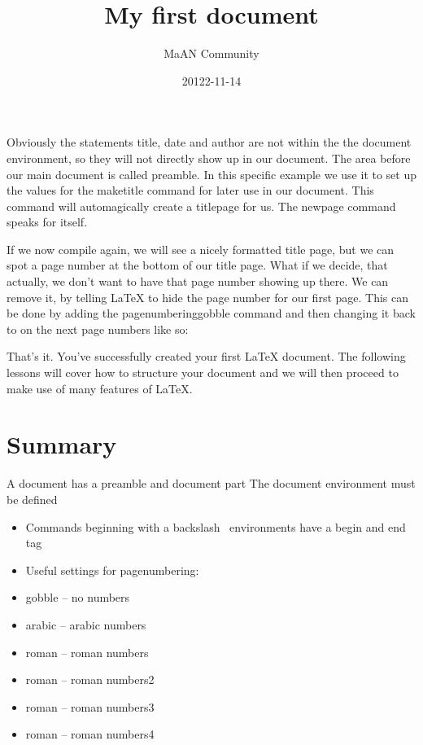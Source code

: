 \documentclass{article}
\title{My first document}
\date{20122-11-14}
\author{MaAN Community}
\begin{document}
	\maketitle
	\newpage
	
Obviously the statements title, date and author are not within the the document environment, so they will not directly show up in our document. The area before our main document is called preamble. In this specific example we use it to set up the values for the maketitle command for later use in our document. This command will automagically create a titlepage for us. The newpage command speaks for itself.

If we now compile again, we will see a nicely formatted title page, but we can spot a page number at the bottom of our title page. What if we decide, that actually, we don’t want to have that page number showing up there. We can remove it, by telling LaTeX to hide the page number for our first page. This can be done by adding the pagenumbering{gobble} command and then changing it back to  on the next page numbers like so:


That’s it. You’ve successfully created your first LaTeX document. The following lessons will cover how to structure your document and we will then proceed to make use of many features of LaTeX.

\section*{Summary}

A document has a preamble and document part
The document environment must be defined
\begin{itemize}
	\item Commands beginning with a backslash \, environments have a begin and end tag
	\item Useful settings for pagenumbering:
	\item gobble – no numbers
	\item arabic – arabic numbers
	\item roman – roman numbers
	\item roman – roman numbers2
	\item roman – roman numbers3
	\item roman – roman numbers4
\end{itemize}
\end{document}
